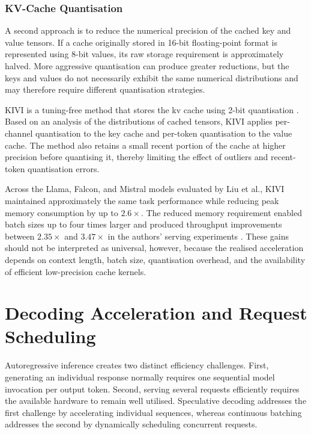 \subsubsection{KV-Cache Quantisation}

A second approach is to reduce the numerical precision of the cached key and
value tensors. If a cache originally stored in 16-bit floating-point format is
represented using 8-bit values, its raw storage requirement is approximately
halved. More aggressive quantisation can produce greater reductions, but the
keys and values do not necessarily exhibit the same numerical distributions
and may therefore require different quantisation strategies.

KIVI is a tuning-free method that stores the \ac{kv} cache using 2-bit
quantisation \cite{liu2024kivi}. Based on an analysis of the distributions of
cached tensors, KIVI applies per-channel quantisation to the key cache and
per-token quantisation to the value cache. The method also retains a small
recent portion of the cache at higher precision before quantising it, thereby
limiting the effect of outliers and recent-token quantisation errors.

Across the Llama, Falcon, and Mistral models evaluated by Liu et al., KIVI
maintained approximately the same task performance while reducing peak memory
consumption by up to \(2.6\times\). The reduced memory requirement enabled batch
sizes up to four times larger and produced throughput improvements between
\(2.35\times\) and \(3.47\times\) in the authors' serving experiments
\cite{liu2024kivi}. These gains should not be interpreted as universal,
however, because the realised acceleration depends on context length, batch
size, quantisation overhead, and the availability of efficient low-precision
cache kernels.


\section{Decoding Acceleration and Request Scheduling}
\label{sec:decoding-scheduling}

Autoregressive inference creates two distinct efficiency challenges. First,
generating an individual response normally requires one sequential model
invocation per output token. Second, serving several requests efficiently
requires the available hardware to remain well utilised. Speculative decoding
addresses the first challenge by accelerating individual sequences, whereas
continuous batching addresses the second by dynamically scheduling concurrent
requests.

